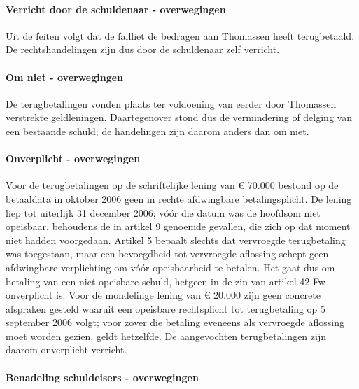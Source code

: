 \documentclass[
  dutch,
  a4paper,
]{article}
\begin{document}
\paragraph{Verricht door de schuldenaar - overwegingen}\label{verricht-door-de-schuldenaar---overwegingen-76}

Uit de feiten volgt dat de failliet de bedragen aan Thomassen heeft terugbetaald. De rechtshandelingen zijn dus door de schuldenaar zelf verricht.

\paragraph{Om niet - overwegingen}\label{om-niet---overwegingen-76}

De terugbetalingen vonden plaats ter voldoening van eerder door Thomassen verstrekte geldleningen. Daartegenover stond dus de vermindering of delging van een bestaande schuld; de handelingen zijn daarom anders dan om niet.

\paragraph{Onverplicht - overwegingen}\label{onverplicht---overwegingen-76}

Voor de terugbetalingen op de schriftelijke lening van € 70.000 bestond op de betaaldata in oktober 2006 geen in rechte afdwingbare betalingsplicht. De lening liep tot uiterlijk 31 december 2006; vóór die datum was de hoofdsom niet opeisbaar, behoudens de in artikel 9 genoemde gevallen, die zich op dat moment niet hadden voorgedaan. Artikel 5 bepaalt slechts dat vervroegde terugbetaling was toegestaan, maar een bevoegdheid tot vervroegde aflossing schept geen afdwingbare verplichting om vóór opeisbaarheid te betalen. Het gaat dus om betaling van een niet-opeisbare schuld, hetgeen in de zin van artikel 42 Fw onverplicht is. Voor de mondelinge lening van € 20.000 zijn geen concrete afspraken gesteld waaruit een opeisbare rechtsplicht tot terugbetaling op 5 september 2006 volgt; voor zover die betaling eveneens als vervroegde aflossing moet worden gezien, geldt hetzelfde. De aangevochten terugbetalingen zijn daarom onverplicht verricht.

\paragraph{Benadeling schuldeisers - overwegingen}\label{benadeling-schuldeisers---overwegingen-76}
\end{document}
